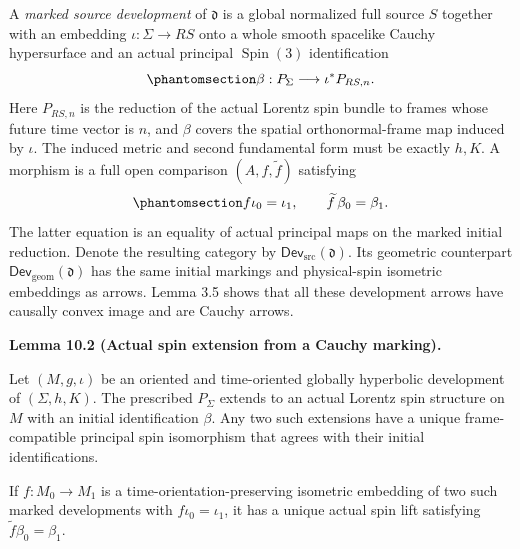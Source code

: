\documentclass[
  english,
  11pt,
  reqno]{amsart}
\makeatletter
\newcommand{\pandocstatementheading}[1]{%
  \par\if@nobreak\else
    \addpenalty{\@beginparpenalty}%
    \addvspace{.5\baselineskip plus .2\baselineskip minus .2\baselineskip}%
  \fi
  {\normalfont\bfseries #1\par}%
  \nobreak\@afterindenttrue\@afterheading
}
\makeatother
\begin{document}
A \emph{marked source development} of \(\mathfrak d\) is a global
normalized full source \(S\) together with an embedding
\(\iota:\Sigma\to RS\) onto a whole smooth spacelike Cauchy hypersurface
and an actual principal \(\operatorname{Spin}(3)\) identification
\begin{equation}\protect\phantomsection\label{eq:global-initial-spin-marking}{
\beta:P_\Sigma\longrightarrow\iota^*P_{RS,n}.
}\end{equation} Here \(P_{RS,n}\) is the reduction of the actual Lorentz
spin bundle to frames whose future time vector is \(n\), and \(\beta\)
covers the spatial orthonormal-frame map induced by \(\iota\). The
induced metric and second fundamental form must be exactly \(h,K\). A
morphism is a full open comparison \((A,f,\widetilde f)\) satisfying
\begin{equation}\protect\phantomsection\label{eq:global-marked-development-arrow}{
f\iota_0=\iota_1,
\qquad
\widetilde f\,\beta_0=\beta_1.
}\end{equation} The latter equation is an equality of actual principal
maps on the marked initial reduction. Denote the resulting category by
\(\mathsf{Dev}_{\mathrm{src}}(\mathfrak d)\). Its geometric counterpart
\(\mathsf{Dev}_{\mathrm{geom}}(\mathfrak d)\) has the same initial
markings and physical-spin isometric embeddings as arrows. Lemma 3.5
shows that all these development arrows have causally convex image and
are Cauchy arrows.

\pandocstatementheading{\protect{}\label{lem:global-initial-spin-extension}Lemma 10.2 (Actual spin extension from a Cauchy marking).}

Let \((M,g,\iota)\) be an oriented and time-oriented globally hyperbolic
development of \((\Sigma,h,K)\). The prescribed \(P_\Sigma\) extends to
an actual Lorentz spin structure on \(M\) with an initial identification
\(\beta\). Any two such extensions have a unique frame-compatible
principal spin isomorphism that agrees with their initial
identifications.

If \(f:M_0\to M_1\) is a time-orientation-preserving isometric embedding
of two such marked developments with \(f\iota_0=\iota_1\), it has a
unique actual spin lift satisfying \(\widetilde f\beta_0=\beta_1\).
\end{document}
